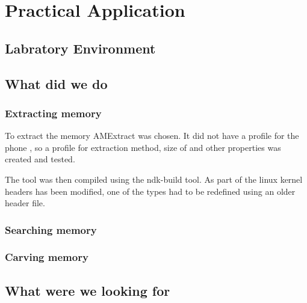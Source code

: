 \section{Practical Application}
\lipsum[1-2]
\subsection{Labratory Environment}
\lipsum[4-5]
\subsection{What did we do}
\lipsum[6]

\subsubsection{Extracting memory}
To extract the memory AMExtract was chosen. %
 It did not have a profile for the phone %
 , so a profile for extraction method, size of %
 and other properties was created and tested.
 
 The tool was then compiled using the ndk-build tool. As part of the linux kernel headers has been modified, one of the types had to be redefined using an older header file.

\subsubsection{Searching memory}

\subsubsection{Carving memory}

\subsection{What were we looking for}
\lipsum[7]